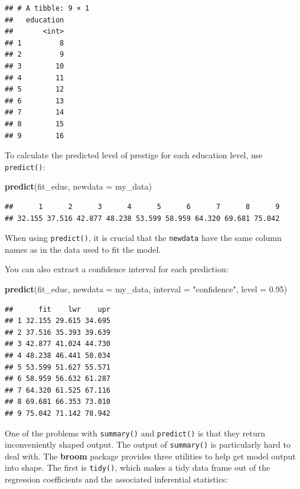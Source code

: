 \documentclass[12pt,oneside,openany]{book}
\newenvironment{Shaded}{\begin{snugshade}}{\end{snugshade}}
\newcommand{\KeywordTok}[1]{\textcolor[rgb]{0.13,0.29,0.53}{\textbf{{#1}}}}
\newcommand{\DataTypeTok}[1]{\textcolor[rgb]{0.13,0.29,0.53}{{#1}}}
\newcommand{\FloatTok}[1]{\textcolor[rgb]{0.00,0.00,0.81}{{#1}}}
\newcommand{\StringTok}[1]{\textcolor[rgb]{0.31,0.60,0.02}{{#1}}}
\newcommand{\NormalTok}[1]{{#1}}
\begin{document}
\begin{verbatim}
## # A tibble: 9 × 1
##   education
##       <int>
## 1         8
## 2         9
## 3        10
## 4        11
## 5        12
## 6        13
## 7        14
## 8        15
## 9        16
\end{verbatim}

To calculate the predicted level of prestige for each education level,
use \texttt{predict()}:

\begin{Shaded}
\begin{Highlighting}[]
\KeywordTok{predict}\NormalTok{(fit_educ, }\DataTypeTok{newdata =} \NormalTok{my_data)}
\end{Highlighting}
\end{Shaded}

\begin{verbatim}
##      1      2      3      4      5      6      7      8      9 
## 32.155 37.516 42.877 48.238 53.599 58.959 64.320 69.681 75.042
\end{verbatim}

When using \texttt{predict()}, it is crucial that the \texttt{newdata}
have the same column names as in the data used to fit the model.

You can also extract a confidence interval for each prediction:

\begin{Shaded}
\begin{Highlighting}[]
\KeywordTok{predict}\NormalTok{(fit_educ,}
        \DataTypeTok{newdata =} \NormalTok{my_data,}
        \DataTypeTok{interval =} \StringTok{"confidence"}\NormalTok{,}
        \DataTypeTok{level =} \FloatTok{0.95}\NormalTok{)}
\end{Highlighting}
\end{Shaded}

\begin{verbatim}
##      fit    lwr    upr
## 1 32.155 29.615 34.695
## 2 37.516 35.393 39.639
## 3 42.877 41.024 44.730
## 4 48.238 46.441 50.034
## 5 53.599 51.627 55.571
## 6 58.959 56.632 61.287
## 7 64.320 61.525 67.116
## 8 69.681 66.353 73.010
## 9 75.042 71.142 78.942
\end{verbatim}

One of the problems with \texttt{summary()} and \texttt{predict()} is
that they return inconveniently shaped output. The output of
\texttt{summary()} is particularly hard to deal with. The \textbf{broom}
package provides three utilities to help get model output into shape.
The first is \texttt{tidy()}, which makes a tidy data frame out of the
regression coefficients and the associated inferential statistics:
\end{document}

